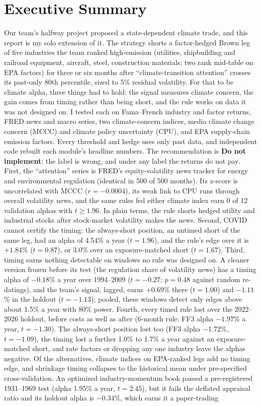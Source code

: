 \section*{Executive Summary}
\label{sec:exec}
Our team's halfway project proposed a state-dependent climate trade, and this report is my solo extension of it. The strategy shorts a factor-hedged Brown leg of five industries the team ranked high-emission (utilities, shipbuilding and railroad equipment, aircraft, steel, construction materials; two rank mid-table on EPA factors) for three or six months after ``climate-transition attention'' crosses its past-only 80th percentile, sized to 5\% residual volatility. For that to be climate alpha, three things had to hold: the signal measures climate concern, the gain comes from timing rather than being short, and the rule works on data it was not designed on. I tested each on Fama--French industry and factor returns, FRED news and macro series, two climate-concern indices, media climate change concern (MCCC) and climate policy uncertainty (CPU), and EPA supply-chain emission factors. Every threshold and hedge uses only past data, and independent code rebuilt each module's headline numbers. The recommendation is \textbf{Do not implement}: the label is wrong, and under any label the returns do not pay. First, the ``attention'' series is FRED's equity-volatility news tracker for energy and environmental regulation (identical in 500 of 500 months). Its z-score is uncorrelated with MCCC ($r=-0.0004$), its weak link to CPU runs through overall volatility news, and the same rules fed either climate index earn 0 of 12 validation alphas with $t\ge1.96$. In plain terms, the rule shorts hedged utility and industrial stocks after stock-market volatility makes the news. Second, COVID cannot certify the timing: the always-short position, an untimed short of the same leg, had an alpha of 4.54\% a year ($t=1.96$), and the rule's edge over it is $+1.84$\% ($t=0.87$), or 3.0\% over an exposure-matched short ($t=1.67$). Third, timing earns nothing detectable on windows no rule was designed on. A cleaner version frozen before its test (the regulation share of volatility news) has a timing alpha of $-0.18$\% a year over 1994--2009 ($t=-0.27$; $p=0.48$ against random re-datings), and the team's signal, lagged, earns $+0.69$\% there ($t=1.00$) and $-1.11$\% in the holdout ($t=-1.13$); pooled, these windows detect only edges above about 1.5\% a year with 80\% power. Fourth, every timed rule lost over the 2022--2026 holdout, before costs as well as after (6-month rule: FF3 alpha $-1.97$\% a year, $t=-1.30$). The always-short position lost too (FF3 alpha $-1.72$\%, $t=-1.09$), the timing lost a further 1.0\% to 1.7\% a year against an exposure-matched short, and rate factors or dropping any one industry leave the alphas negative. Of the alternatives, climate indices on EPA-ranked legs add no timing edge, and shrinkage timing collapses to the historical mean under pre-specified cross-validation. An optimized industry-momentum book passed a pre-registered 1931--1969 test (alpha 1.95\% a year, $t=2.45$), but it fails the deflated appraisal ratio and its holdout alpha is $-0.34$\%, which earns it a paper-trading 